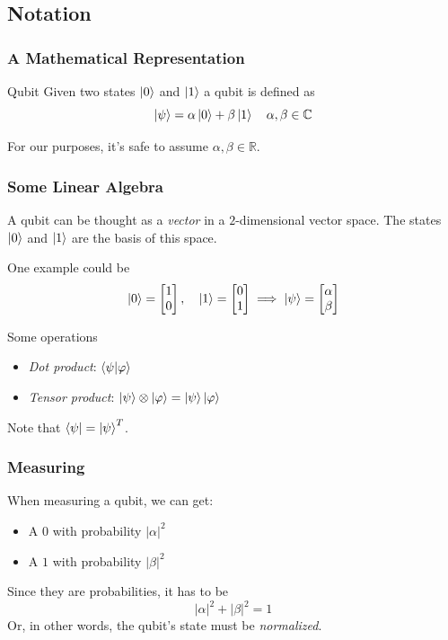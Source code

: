 \documentclass{beamer}
\begin{document}
  \subsection{Notation}
  \begin{frame}
    \frametitle{A Mathematical Representation}
    \begin{block}{Qubit}
      Given two states $\ket{0}$ and $\ket{1}$ a qubit is defined as
      \begin{equation*}
        \ket{\psi} = \alpha\ket{0} + \beta\ket{1} \quad \alpha,\beta\in\mathbb C
      \end{equation*}
    \end{block}

    For our purposes, it's safe to assume $\alpha,\beta\in\mathbb R$.
  \end{frame}
  \begin{frame}
    \frametitle{Some Linear Algebra}
    A qubit can be thought as a \textit{vector} in a $2$-dimensional vector space.
    The states $\ket 0$ and $\ket 1$ are the basis of this space.

    One example could be
    \begin{equation*}
      \ket{0} = \begin{bmatrix} 1 \\ 0 \end{bmatrix},
      \quad
      \ket{1} = \begin{bmatrix} 0 \\ 1 \end{bmatrix}
      \implies
      \ket{\psi} = \begin{bmatrix} \alpha \\ \beta \end{bmatrix}
    \end{equation*}

    Some operations
    \begin{itemize}
      \item \textit{Dot product}: $\braket{\psi|\varphi}$
      \item \textit{Tensor product}: $\ket{\psi}\otimes\ket{\varphi} = \ket{\psi}\ket{\varphi}$
    \end{itemize}

    Note that $\bra{\psi} = \ket{\psi}^T$.
  \end{frame}
  \begin{frame}
    \frametitle{Measuring}
    When measuring a qubit, we can get:
    \begin{itemize}
      \item A $0$ with probability $|\alpha|^2$
      \item A $1$ with probability $|\beta|^2$
    \end{itemize}

    Since they are probabilities, it has to be
    \begin{equation*}
      |\alpha|^2 + |\beta|^2 = 1
    \end{equation*}
    Or, in other words, the qubit's state must be \textit{normalized}.
  \end{frame}
\end{document}
